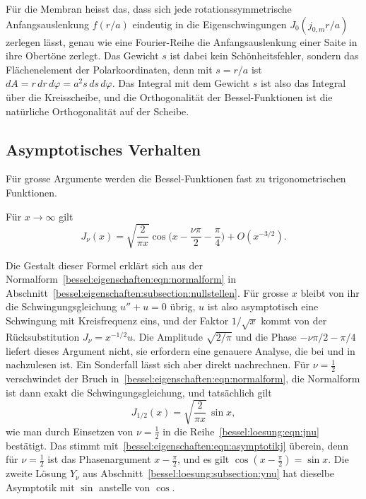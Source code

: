 Für die Membran heisst das, dass sich jede rotationssymmetrische Anfangsauslenkung $f(r/a)$ eindeutig in die Eigenschwingungen $J_0(j_{0,m}r/a)$ zerlegen lässt, genau wie eine Fourier-Reihe die Anfangsauslenkung einer Saite in ihre Obertöne zerlegt.
Das Gewicht $s$ ist dabei kein Schönheitsfehler, sondern das Flächenelement der Polarkoordinaten, denn mit $s=r/a$ ist $dA=r\,dr\,d\varphi=a^2s\,ds\,d\varphi$.
Das Integral mit dem Gewicht $s$ ist also das Integral über die Kreisscheibe, und die Orthogonalität der Bessel-Funktionen ist die natürliche Orthogonalität auf der Scheibe.

%
%
\subsection{Asymptotisches Verhalten
\label{bessel:eigenschaften:subsection:asymptotik}}
Für grosse Argumente werden die Bessel-Funktionen fast zu trigonometrischen Funktionen.
%
%

\begin{satz}
\label{bessel:eigenschaften:satz:asymptotik}
Für $x\to\infty$ gilt
\begin{equation}
J_\nu(x)
=
\sqrt{\frac{2}{\pi x}}
\cos\biggl(x-\frac{\nu\pi}{2}-\frac{\pi}{4}\biggr)
+
O(x^{-3/2}).
\label{bessel:eigenschaften:eqn:asymptotikj}
\end{equation}
\end{satz}

Die Gestalt dieser Formel erklärt sich aus der Normalform~\eqref{bessel:eigenschaften:eqn:normalform} in Abschnitt~\ref{bessel:eigenschaften:subsection:nullstellen}.
Für grosse $x$ bleibt von ihr die Schwingungsgleichung $u''+u=0$ übrig, $u$ ist also asymp\-to\-tisch eine Schwingung mit Kreisfrequenz eins, und der Faktor $1/\sqrt{x}$ kommt von der Rücksubstitution $J_\nu=x^{-1/2}u$.
Die Amplitude $\sqrt{2/\pi}$ und die Phase $-\nu\pi/2-\pi/4$ liefert dieses Argument nicht, sie erfordern eine genauere Analyse, die bei \cite[Kapitel~VII]{bessel:watson} und in \cite[Formel~10.17.3]{bessel:dlmf} nachzulesen ist.
Ein Sonderfall lässt sich aber direkt nachrechnen.
Für $\nu=\frac12$ verschwindet der Bruch in~\eqref{bessel:eigenschaften:eqn:normalform}, die Normalform ist dann exakt die Schwingungsgleichung, und tatsächlich gilt
\begin{equation}
J_{1/2}(x)
=
\sqrt{\frac{2}{\pi x}}\,\sin x ,
\label{bessel:eigenschaften:eqn:jhalb}
\end{equation}
wie man durch Einsetzen von $\nu=\frac12$ in die Reihe~\eqref{bessel:loesung:eqn:jnu} bestätigt.
Das stimmt mit~\eqref{bessel:eigenschaften:eqn:asymptotikj} überein, denn für $\nu=\frac12$ ist das Phasenargument $x-\frac{\pi}{2}$, und es gilt $\cos(x-\frac{\pi}{2})=\sin x$.
Die zweite Lösung $Y_\nu$ aus Abschnitt~\ref{bessel:loesung:subsection:ynu} hat dieselbe Asymptotik mit $\sin$ anstelle von $\cos$.

